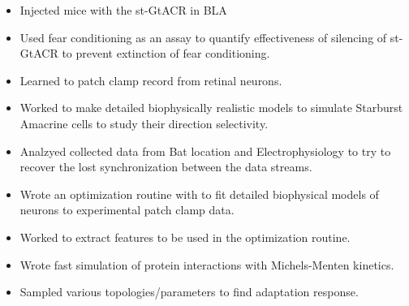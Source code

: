 \documentclass[10pt,a4paper]{altacv}
\begin{document}
\begin{itemize}
\item Injected mice with the st-GtACR in BLA
\item Used fear conditioning as an assay to quantify effectiveness of silencing of st-GtACR to prevent extinction of fear conditioning.
\end{itemize}


\divider


\begin{itemize}
\item Learned to patch clamp record from retinal neurons.
\item Worked to make detailed biophysically realistic models to simulate Starburst Amacrine cells to study their direction selectivity.
\end{itemize}

\divider


\begin{itemize}
\item Analzyed collected data from Bat location and Electrophysiology to try to recover the lost synchronization between the data streams.
\end{itemize}


\divider



\begin{itemize}
\item Wrote an optimization routine with to fit detailed biophysical models of neurons to experimental patch clamp data.
\item Worked to extract features to be used in the optimization routine.
\end{itemize}

\vspace{2em}



\begin{itemize}
\item Wrote fast simulation of protein interactions with Michels-Menten kinetics.
\item Sampled various topologies/parameters to find adaptation response. 
\end{itemize}
\end{document}
